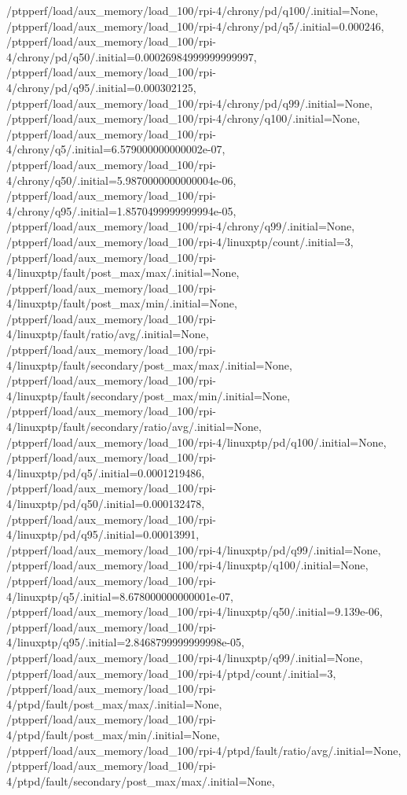 {    /ptpperf/load/aux_memory/load_100/rpi-4/chrony/pd/q100/.initial=None,
    /ptpperf/load/aux_memory/load_100/rpi-4/chrony/pd/q5/.initial=0.000246,
    /ptpperf/load/aux_memory/load_100/rpi-4/chrony/pd/q50/.initial=0.00026984999999999997,
    /ptpperf/load/aux_memory/load_100/rpi-4/chrony/pd/q95/.initial=0.000302125,
    /ptpperf/load/aux_memory/load_100/rpi-4/chrony/pd/q99/.initial=None,
    /ptpperf/load/aux_memory/load_100/rpi-4/chrony/q100/.initial=None,
    /ptpperf/load/aux_memory/load_100/rpi-4/chrony/q5/.initial=6.579000000000002e-07,
    /ptpperf/load/aux_memory/load_100/rpi-4/chrony/q50/.initial=5.9870000000000004e-06,
    /ptpperf/load/aux_memory/load_100/rpi-4/chrony/q95/.initial=1.8570499999999994e-05,
    /ptpperf/load/aux_memory/load_100/rpi-4/chrony/q99/.initial=None,
    /ptpperf/load/aux_memory/load_100/rpi-4/linuxptp/count/.initial=3,
    /ptpperf/load/aux_memory/load_100/rpi-4/linuxptp/fault/post_max/max/.initial=None,
    /ptpperf/load/aux_memory/load_100/rpi-4/linuxptp/fault/post_max/min/.initial=None,
    /ptpperf/load/aux_memory/load_100/rpi-4/linuxptp/fault/ratio/avg/.initial=None,
    /ptpperf/load/aux_memory/load_100/rpi-4/linuxptp/fault/secondary/post_max/max/.initial=None,
    /ptpperf/load/aux_memory/load_100/rpi-4/linuxptp/fault/secondary/post_max/min/.initial=None,
    /ptpperf/load/aux_memory/load_100/rpi-4/linuxptp/fault/secondary/ratio/avg/.initial=None,
    /ptpperf/load/aux_memory/load_100/rpi-4/linuxptp/pd/q100/.initial=None,
    /ptpperf/load/aux_memory/load_100/rpi-4/linuxptp/pd/q5/.initial=0.0001219486,
    /ptpperf/load/aux_memory/load_100/rpi-4/linuxptp/pd/q50/.initial=0.000132478,
    /ptpperf/load/aux_memory/load_100/rpi-4/linuxptp/pd/q95/.initial=0.00013991,
    /ptpperf/load/aux_memory/load_100/rpi-4/linuxptp/pd/q99/.initial=None,
    /ptpperf/load/aux_memory/load_100/rpi-4/linuxptp/q100/.initial=None,
    /ptpperf/load/aux_memory/load_100/rpi-4/linuxptp/q5/.initial=8.678000000000001e-07,
    /ptpperf/load/aux_memory/load_100/rpi-4/linuxptp/q50/.initial=9.139e-06,
    /ptpperf/load/aux_memory/load_100/rpi-4/linuxptp/q95/.initial=2.8468799999999998e-05,
    /ptpperf/load/aux_memory/load_100/rpi-4/linuxptp/q99/.initial=None,
    /ptpperf/load/aux_memory/load_100/rpi-4/ptpd/count/.initial=3,
    /ptpperf/load/aux_memory/load_100/rpi-4/ptpd/fault/post_max/max/.initial=None,
    /ptpperf/load/aux_memory/load_100/rpi-4/ptpd/fault/post_max/min/.initial=None,
    /ptpperf/load/aux_memory/load_100/rpi-4/ptpd/fault/ratio/avg/.initial=None,
    /ptpperf/load/aux_memory/load_100/rpi-4/ptpd/fault/secondary/post_max/max/.initial=None,
}
